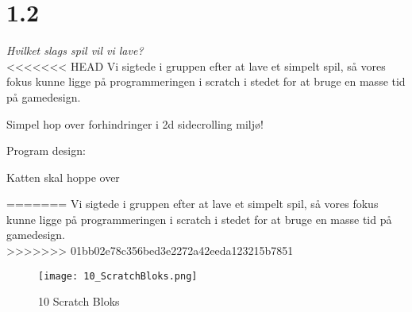 \section{1.2}

\textit{Hvilket slags spil vil vi lave?}\\
<<<<<<< HEAD
Vi sigtede i gruppen efter at lave et simpelt spil, så vores fokus kunne ligge på programmeringen i scratch i stedet for at bruge en masse tid på gamedesign.

Simpel hop over forhindringer i 2d sidecrolling miljø!

Program design:

Katten skal hoppe over 

=======
Vi sigtede i gruppen efter at lave et simpelt spil,
så vores fokus kunne ligge på programmeringen i scratch
i stedet for at bruge en masse tid på gamedesign.\\
>>>>>>> 01bb02e78c356bed3e2272a42eeda123215b7851

\begin{figure}[ht]
	\centering
	\texttt{[image: 10\_ScratchBloks.png]}
	\caption{{10 Scratch Bloks}}
	\label{fig:10Bloks}
\end{figure}
